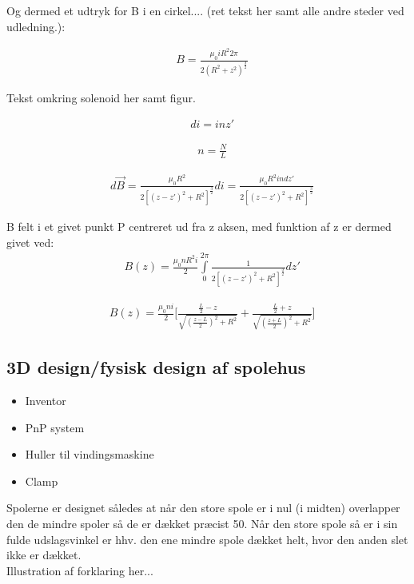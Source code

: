 Og dermed et udtryk for B i en cirkel.... (ret tekst her samt alle andre steder ved udledning.):


\begin{align}
	&B=\frac{\mu_0 iR^2 2\pi}{2(R^2+z^2)^\frac{3}{2}}
\end{align}




Tekst omkring solenoid her samt figur.



\begin{align}
	&di=inz'
\end{align}

\begin{align}
	&n=\frac{N}{L}
\end{align}

\begin{align}
	&d\vec{B}=\frac{\mu_0 R^2}{2[(z-z')^2+R^2]^\frac{3}{2}}di = \frac{\mu_0 R^2 i n dz'}{2[(z-z')^2+R^2]^\frac{3}{2}}
\end{align}


B felt i et givet punkt P centreret ud fra z aksen, med funktion af z er dermed givet ved:
\begin{align}
	&B(z)=\frac{\mu_0 n R^2 i}{2}\int\limits_{0}^{2\pi}\frac{1}{2[(z-z')^2+R^2]^\frac{3}{2}}dz'
\end{align}

\begin{align}
	&B(z)=\frac{\mu_0 n i}{2}\bigg[\frac{\frac{L}{2}-z}{\sqrt{(\frac{z-L}{2})^2+R^2}}+\frac{\frac{L}{2}+z}{\sqrt{(\frac{z+L}{2})^2+R^2}}\bigg]
\end{align}

\subsection{3D design/fysisk design af spolehus}
\begin{itemize}
	\item Inventor
	\item PnP system
	\item Huller til vindingsmaskine
	\item Clamp
\end{itemize}
Spolerne er designet således at når den store spole er i nul (i midten) overlapper den de mindre spoler så de er dækket præcist 50\percent. Når den store spole så er i sin fulde udslagsvinkel er hhv. den ene mindre spole dækket helt, hvor den anden slet ikke er dækket. \\

Illustration af forklaring her...
